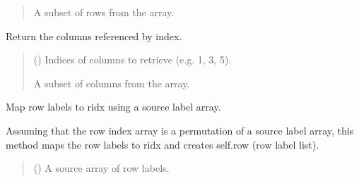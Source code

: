 \documentclass[letterpaper,12pt,english]{sphinxmanual}
\begin{document}
\begin{fulllineitems}
\begin{fulllineitems}
\begin{quote}
\begin{description}
\sphinxAtStartPar
{} \textendash{} A subset of rows from the array.

\end{description}\end{quote}

\end{fulllineitems}


\begin{fulllineitems}
\label{\detokenize{api/core:cbmpy.CBCommon.StructMatrix.getColsByIdx}}
\pysigstartsignatures
\pysiglinewithargsret
{}
{}
{}
\pysigstopsignatures
\sphinxAtStartPar
Return the columns referenced by index.
\begin{quote}\begin{description}
\sphinxAtStartPar
{} () \textendash{} Indices of columns to retrieve (e.g. 1, 3, 5).

\sphinxAtStartPar
{} \textendash{} A subset of columns from the array.

\end{description}\end{quote}

\end{fulllineitems}


\begin{fulllineitems}
\label{\detokenize{api/core:cbmpy.CBCommon.StructMatrix.setRow}}
\pysigstartsignatures
\pysiglinewithargsret
{}
{}
{}
\pysigstopsignatures
\sphinxAtStartPar
Map row labels to ridx using a source label array.

\sphinxAtStartPar
Assuming that the row index array is a permutation of a source label array,
this method maps the row labels to ridx and creates self.row (row label list).
\begin{quote}\begin{description}
\sphinxAtStartPar
{} () \textendash{} A source array of row labels.


\end{description}
\end{quote}
\end{fulllineitems}
\end{fulllineitems}
\end{document}
